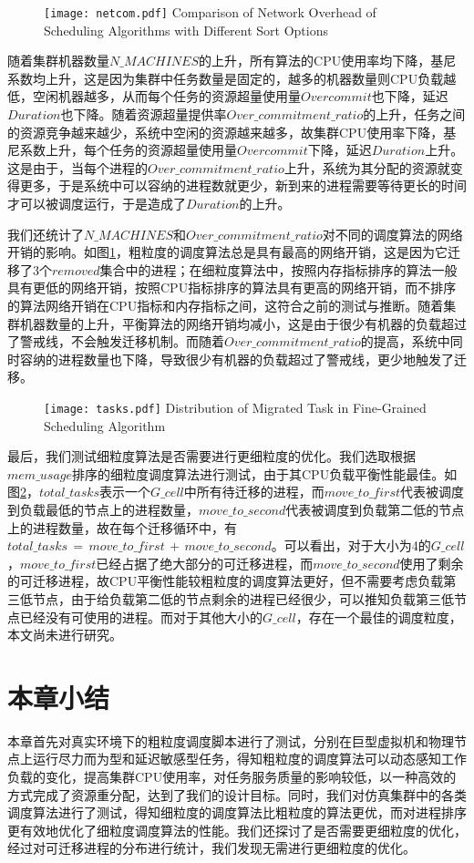 \begin{figure}[!htp]
  \centering
  \texttt{[image: netcom.pdf]}
    {Comparison of Network Overhead of Scheduling Algorithms with Different Sort Options}
  \label{fig:netcom}
\end{figure}

随着集群机器数量$N\_MACHINES$的上升，所有算法的CPU使用率均下降，基尼系数均上升，这是因为集群中任务数量是固定的，越多的机器数量则CPU负载越低，空闲机器越多，从而每个任务的资源超量使用量$Overcommit$也下降，延迟$Duration$也下降。随着资源超量提供率$Over\_commitment\_ratio$的上升，任务之间的资源竞争越来越少，系统中空闲的资源越来越多，故集群CPU使用率下降，基尼系数上升，每个任务的资源超量使用量$Overcommit$下降，延迟$Duration$上升。这是由于，当每个进程的$Over\_commitment\_ratio$上升，系统为其分配的资源就变得更多，于是系统中可以容纳的进程数就更少，新到来的进程需要等待更长的时间才可以被调度运行，于是造成了$Duration$的上升。

我们还统计了$N\_MACHINES$和$Over\_commitment\_ratio$对不同的调度算法的网络开销的影响。如图\ref{fig:netcom}，粗粒度的调度算法总是具有最高的网络开销，这是因为它迁移了3个$removed$集合中的进程；在细粒度算法中，按照内存指标排序的算法一般具有更低的网络开销，按照CPU指标排序的算法具有更高的网络开销，而不排序的算法网络开销在CPU指标和内存指标之间，这符合之前的测试与推断。随着集群机器数量的上升，平衡算法的网络开销均减小，这是由于很少有机器的负载超过了警戒线，不会触发迁移机制。而随着$Over\_commitment\_ratio$的提高，系统中同时容纳的进程数量也下降，导致很少有机器的负载超过了警戒线，更少地触发了迁移。

\begin{figure}[!htp]
  \centering
  \texttt{[image: tasks.pdf]}
    {Distribution of Migrated Task in Fine-Grained Scheduling Algorithm}
  \label{fig:distr}
\end{figure}



最后，我们测试细粒度算法是否需要进行更细粒度的优化。我们选取根据$mem\_usage$排序的细粒度调度算法进行测试，由于其CPU负载平衡性能最佳。如图\ref{fig:distr}，$total\_tasks$表示一个$G\_cell$中所有待迁移的进程，而$move\_to\_first$代表被调度到负载最低的节点上的进程数量，$move\_to\_second$代表被调度到负载第二低的节点上的进程数量，故在每个迁移循环中，有$total\_tasks\,=\,move\_to\_first\,+\,move\_to\_second$。可以看出，对于大小为4的$G\_cell$，$move\_to\_first$已经占据了绝大部分的可迁移进程，而$move\_to\_second$使用了剩余的可迁移进程，故CPU平衡性能较粗粒度的调度算法更好，但不需要考虑负载第三低节点，由于给负载第二低的节点剩余的进程已经很少，可以推知负载第三低节点已经没有可使用的进程。而对于其他大小的$G\_cell$，存在一个最佳的调度粒度，本文尚未进行研究。

\section{本章小结}
本章首先对真实环境下的粗粒度调度脚本进行了测试，分别在巨型虚拟机和物理节点上运行尽力而为型和延迟敏感型任务，得知粗粒度的调度算法可以动态感知工作负载的变化，提高集群CPU使用率，对任务服务质量的影响较低，以一种高效的方式完成了资源重分配，达到了我们的设计目标。同时，我们对仿真集群中的各类调度算法进行了测试，得知细粒度的调度算法比粗粒度的算法更优，而对进程排序更有效地优化了细粒度调度算法的性能。我们还探讨了是否需要更细粒度的优化，经过对可迁移进程的分布进行统计，我们发现无需进行更细粒度的优化。

